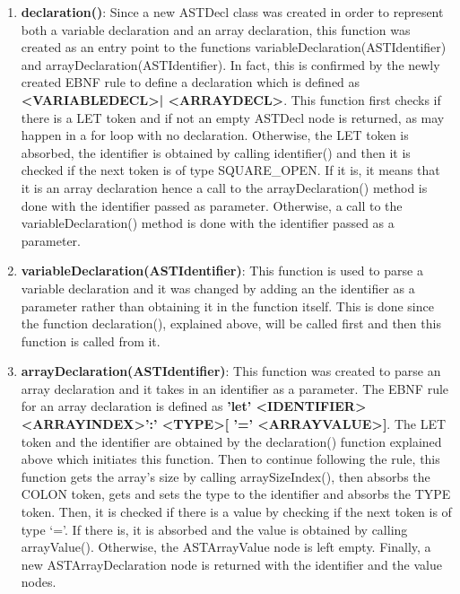 \documentclass{article}
\begin{document}
\begin{enumerate}
								\item \textbf{declaration()}: Since a new ASTDecl class was created in order to represent both a variable declaration and an array declaration, this function was created as an entry point to the functions variableDeclaration(ASTIdentifier) and arrayDeclaration(ASTIdentifier). In fact, this is confirmed by the newly created EBNF rule to define a declaration which is defined as \textbf{\textless VARIABLEDECL\textgreater | \textless ARRAYDECL\textgreater}. This function first checks if there is a LET token and if not an empty ASTDecl node is returned, as may happen in a for loop with no declaration. Otherwise, the LET token is absorbed, the identifier is obtained by calling identifier() and then it is checked if the next token is of type SQUARE\_OPEN. If it is, it means that it is an array declaration hence a call to the arrayDeclaration() method is done with the identifier passed as parameter. Otherwise, a call to the variableDeclaration() method is done with the identifier passed as a parameter.
							
				\item \textbf{variableDeclaration(ASTIdentifier)}: This function is used to parse a variable declaration and it was changed by adding an the identifier as a parameter rather than obtaining it in the function itself. This is done since the function declaration(), explained above, will be called first and then this function is called from it.
				
				\item \textbf{arrayDeclaration(ASTIdentifier)}: This function was created to parse an array declaration and it takes in an identifier as a parameter. The EBNF rule for an array declaration is defined as \textbf{'let' \textless IDENTIFIER\textgreater \textless ARRAYINDEX\textgreater ':' \textless TYPE\textgreater [ '=' \textless ARRAYVALUE\textgreater ]}. The LET token and the identifier are obtained by the declaration() function explained above which initiates this function. Then to continue following the rule, this function gets the array's size by calling arraySizeIndex(), then absorbs the COLON token, gets and sets the type to the identifier and absorbs the TYPE token. Then, it is checked if there is a value by checking if the next token is of type `='. If there is, it is absorbed and the value is obtained by calling arrayValue(). Otherwise, the ASTArrayValue node is left empty. Finally, a new ASTArrayDeclaration node is returned with the identifier and the value nodes.
				

\end{enumerate}
\end{document}
